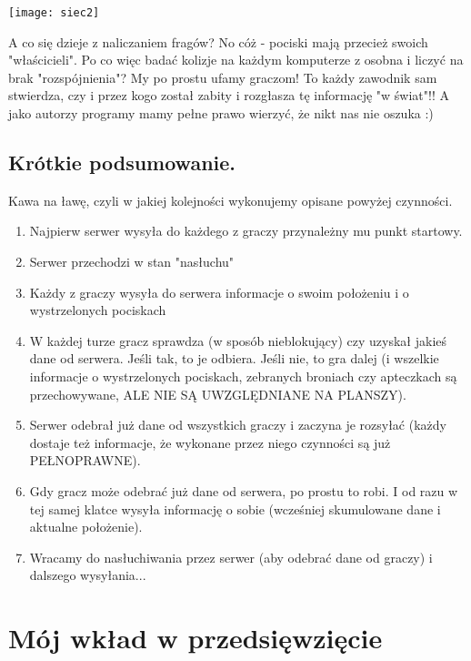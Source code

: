\documentclass[licencjacka]{pracamgr}
\begin{document}
\begin{center}
\texttt{[image: siec2]}
\end{center}

A co się dzieje z naliczaniem fragów? No cóż - pociski mają przecież swoich "właścicieli". Po co więc badać kolizje na każdym komputerze z osobna i liczyć na brak "rozspójnienia"? My po prostu ufamy graczom! To każdy zawodnik sam stwierdza, czy i przez kogo został zabity i rozgłasza tę informację "w świat"!! A jako autorzy programy mamy pełne prawo wierzyć, że nikt nas nie oszuka :)

\section{Krótkie podsumowanie.}

Kawa na ławę, czyli w jakiej kolejności wykonujemy opisane powyżej czynności.

\begin{enumerate}
    \item Najpierw serwer wysyła do każdego z graczy przynależny mu punkt startowy.
    \item Serwer przechodzi w stan "nasłuchu"
    \item Każdy z graczy wysyła do serwera informacje o swoim położeniu i o wystrzelonych pociskach
    \item W każdej turze gracz sprawdza (w sposób nieblokujący) czy uzyskał jakieś dane od serwera.
    Jeśli tak, to je odbiera. Jeśli nie, to gra dalej (i wszelkie informacje o wystrzelonych pociskach,
    zebranych broniach czy apteczkach są przechowywane, ALE NIE SĄ UWZGLĘDNIANE NA PLANSZY).
    \item Serwer odebrał już dane od wszystkich graczy i zaczyna je rozsyłać (każdy dostaje też informacje,
    że wykonane przez niego czynności są już PEŁNOPRAWNE).
    \item Gdy gracz może odebrać już dane od serwera, po prostu to robi. I od razu w tej samej klatce
    wysyła informację o sobie (wcześniej skumulowane dane i aktualne położenie).
    \item Wracamy do nasłuchiwania przez serwer (aby odebrać dane od graczy) i dalszego wysyłania...
\end{enumerate}

\chapter{Mój wkład w przedsięwzięcie}\label{r:fifak}
\end{document}

